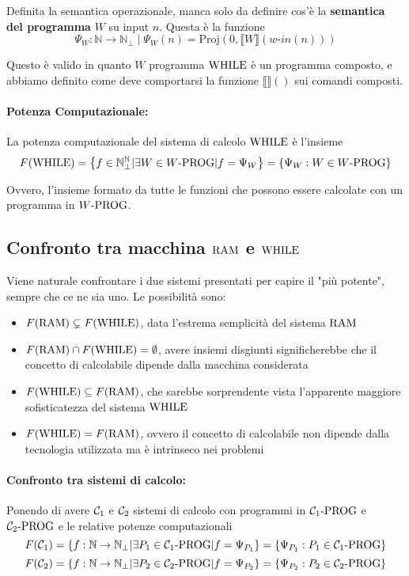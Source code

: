 Definita la semantica operazionale, manca solo da definire cos'è la \textbf{semantica del programma} $W$ su input $n$. Questa è la funzione 
$$ \Psi_W: \mathbb{N} \rightarrow \mathbb{N}_\bot \; | \; \Psi_W (n) = \text{Proj}\left(0, \llbracket W \rrbracket (w\text{-}in(n))\right)$$

Questo è valido in quanto $W$ programma $\text{WHILE}$ è un programma composto, e abbiamo definito come deve comportarsi la funzione $\llbracket \rrbracket ()$ sui comandi composti.\\

\paragraph{Potenza Computazionale:} La potenza computazionale del sistema di calcolo $\text{WHILE}$ è l'insieme 
$$ F(\text{WHILE}) = \left\{f \in \mathbb{N}^{\mathbb{N}}_\bot | \exists W \in W\text{-PROG} | f = \Psi_W \right\} = \left\{\Psi_W : W \in W\text{-PROG} \right\}$$

Ovvero, l'insieme formato da tutte le funzioni che possono essere calcolate con un programma in $W\text{-PROG}$.\\

\subsection{Confronto tra macchina $\text{RAM}$ e $\text{WHILE}$}
Viene naturale confrontare i due sistemi presentati per capire il "più potente", sempre che ce ne sia uno. Le possibilità sono: 
\begin{itemize}
	\item $F(\text{RAM}) \subsetneq F(\text{WHILE})$, data l'estrema semplicità del sistema $\text{RAM}$
	\item $F(\text{RAM}) \cap F(\text{WHILE}) = \emptyset$, avere insiemi disgiunti significherebbe che il concetto di calcolabile dipende dalla macchina considerata
	\item $F(\text{WHILE}) \subseteq F(\text{RAM})$, che sarebbe sorprendente vista l'apparente maggiore sofisticatezza del sistema $\text{WHILE}$
	\item $F(\text{WHILE}) = F(\text{RAM})$, ovvero il concetto di calcolabile non dipende dalla tecnologia utilizzata ma è intrinseco nei problemi
\end{itemize}

\paragraph{Confronto tra sistemi di calcolo:} Ponendo di avere $\mathcal{C}_1$ e $\mathcal{C}_2$ sistemi di calcolo con programmi in $\mathcal{C}_{1}\text{-}\text{PROG}$ e $\mathcal{C}_{2}\text{-}\text{PROG}$ e le relative potenze computazionali
$$ F(\mathcal{C}_1) = \left\{f: \mathbb{N} \rightarrow \mathbb{N}_\bot | \exists P_1 \in \mathcal{C}_{1}\text{-}\text{PROG} | f = \Psi_{P_1} \right\} = \left\{\Psi_{P_1}: P_1 \in \mathcal{C}_{1}\text{-}\text{PROG} \right\} $$
$$ F(\mathcal{C}_2) = \left\{f: \mathbb{N} \rightarrow \mathbb{N}_\bot | \exists P_2 \in \mathcal{C}_{2}\text{-}\text{PROG} | f = \Psi_{P_2} \right\} = \left\{\Psi_{P_2}: P_2 \in \mathcal{C}_{2}\text{-}\text{PROG} \right\} $$

